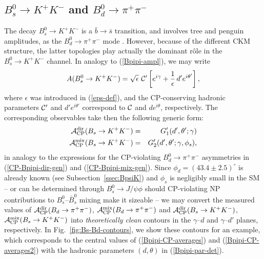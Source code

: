 \documentclass[11pt]{cernrep}
\begin{document}
%
%
%
\boldmath
\subsection{$B^0_s\to K^+K^-$ and $B^0_d\to\pi^+\pi^-$}
\unboldmath
%
%
%
The decay $B^0_s\to K^+K^-$ is a $\bar b \to \bar s$ transition, and
involves tree and penguin amplitudes, as the $B^0_d\to\pi^+\pi^-$ mode 
\cite{RF-BsKK}. However, because of the different CKM structure, the latter 
topologies play actually the dominant r\^ole in the $B^0_s\to K^+K^-$ channel. 
In analogy to (\ref{Bpipi-ampl}), we may write
\begin{equation}\label{BsKK-ampl}
A(B_s^0\to K^+K^-)=\sqrt{\epsilon} \,\, {\cal C}'
\left[e^{i\gamma}+\frac{1}{\epsilon}\,d'e^{i\theta'}\right],
\end{equation}
where $\epsilon$ was introduced in (\ref{eps-def}), and 
the CP-conserving hadronic parameters ${\cal C}'$ and $d'e^{i\theta'}$ 
correspond to ${\cal C}$ and $de^{i\theta}$, respectively. The corresponding
observables take then the following generic form:
\begin{eqnarray}
{\cal A}_{\rm CP}^{\rm dir}(B_s\to K^+K^-)&=&
G_1'(d',\theta';\gamma) \label{CP-BsKK-dir-gen}\\
{\cal A}_{\rm CP}^{\rm mix}(B_s\to K^+K^-)&=&
G_2'(d',\theta';\gamma,\phi_s),\label{CP-BsKK-mix-gen}
\end{eqnarray}
in analogy to the expressions for the CP-violating $B^0_d\to\pi^+\pi^-$
asymmetries in (\ref{CP-Bpipi-dir-gen}) and (\ref{CP-Bpipi-mix-gen}). 
Since $\phi_d=(43.4\pm 2.5)^\circ$ is already known (see
Subsection~\ref{ssec:BpsiK}) and $\phi_s$ is negligibly small
in the SM -- or can be determined through $B^0_s\to J/\psi \phi$ should CP-violating
NP contributions to $B^0_s$--$\bar B^0_s$ mixing make it sizeable -- 
we may convert the measured values of 
${\cal A}_{\rm CP}^{\rm dir}(B_d\to \pi^+\pi^-)$, 
${\cal A}_{\rm CP}^{\rm mix}(B_d\to \pi^+\pi^-)$ and
${\cal A}_{\rm CP}^{\rm dir}(B_s\to K^+K^-)$, 
${\cal A}_{\rm CP}^{\rm mix}(B_s\to K^+K^-)$ into {\it theoretically clean}
contours in the $\gamma$--$d$ and $\gamma$--$d'$ planes, respectively.
In Fig.~\ref{fig:Bs-Bd-contours}, we show these contours for an example,
which corresponds to the central values of (\ref{Bpipi-CP-averages}) and 
(\ref{Bpipi-CP-averages2}) with the hadronic parameters $(d,\theta)$
in (\ref{Bpipi-par-det}). 
\end{document}
